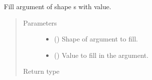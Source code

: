\documentclass[letterpaper,10pt,english]{sphinxmanual}
\begin{document}
\begin{fulllineitems}
\label{\detokenize{reference/py:migraphx.fill_argument}}
\sphinxAtStartPar
Fill argument of shape s with value.
\begin{quote}\begin{description}
\item[{Parameters}] \leavevmode\begin{itemize}
\item {} 
\sphinxAtStartPar
{} ({\hyperref[\detokenize{reference/py:migraphx.shape}]{}}) \textendash{} Shape of argument to fill.

\item {} 
\sphinxAtStartPar
{} () \textendash{} Value to fill in the argument.

\end{itemize}

\item[{Return type}] \leavevmode
\sphinxAtStartPar
{\hyperref[\detokenize{reference/py:migraphx.argument}]{}}

\end{description}\end{quote}

\end{fulllineitems}

\end{document}
